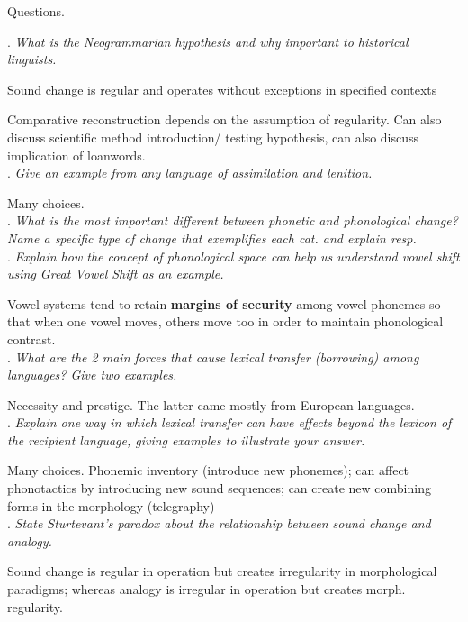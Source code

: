\documentclass{exam}
\begin{document}
Questions.

. \textit{What is the Neogrammarian hypothesis and why important to historical linguists.} 

\noindent Sound change is regular and operates without exceptions in specified contexts 

\noindent Comparative reconstruction depends on the assumption of regularity. Can also discuss scientific method introduction/ testing hypothesis, can also discuss implication of loanwords. \\

. \textit{Give an example from any language of assimilation and lenition.}

\noindent Many choices.\\


. \textit{What is the most important different between phonetic and phonological change? Name a specific type of change that exemplifies each cat. and explain resp.} \\

. \textit{Explain how the concept of phonological space can help us understand vowel shift using Great Vowel Shift as an example.} 

\noindent Vowel systems tend to retain \textbf{margins of security} among vowel phonemes so that when one vowel moves, others move too in order to maintain phonological contrast. \\

. \textit{What are the 2 main forces that cause lexical transfer (borrowing) among languages? Give two examples.}

\noindent Necessity and prestige. The latter came mostly from European languages.\\

. \textit{Explain one way in which lexical transfer can have effects beyond the lexicon of the recipient language, giving examples to illustrate your answer. }

\noindent Many choices. Phonemic inventory (introduce new phonemes); can affect phonotactics by introducing new sound sequences;  can create new combining forms in the morphology (telegraphy) \\

. \textit{State Sturtevant's paradox about the relationship between sound change and analogy.}

\noindent Sound change is regular in operation but creates irregularity in morphological paradigms; whereas analogy is irregular in operation but creates morph. regularity. \\
\end{document}
